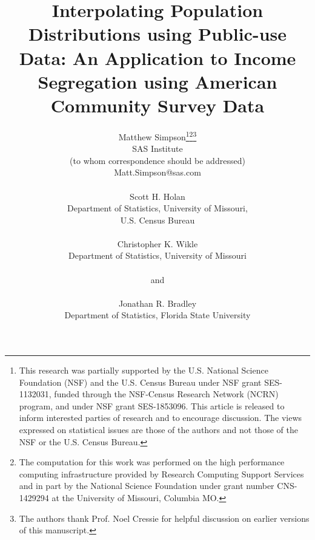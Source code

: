\documentclass[12pt]{article}
\renewcommand{\baselinestretch}{1.5}
\begin{document}
\def\spacingset#1{\renewcommand{\baselinestretch}%
{#1}\small\normalsize} \spacingset{1}


\vskip 2mm

{
  \title{\bf Interpolating Population Distributions using Public-use Data: An Application to Income Segregation using American Community Survey Data}
  \author{Matthew Simpson\thanks{This research was partially supported by the U.S. National Science Foundation (NSF) and the U.S. Census Bureau under NSF grant SES-1132031, funded through the NSF-Census Research Network (NCRN) program, and under NSF grant SES-1853096. This article is released to inform interested parties of research and to encourage discussion.  The views expressed on statistical issues are those of the authors and not those of the NSF or the U.S. Census Bureau.}\thanks{The computation for this work was performed on the high performance computing infrastructure provided by Research Computing Support Services and in part by the National Science Foundation under grant number CNS-1429294 at the University of Missouri, Columbia MO.}\thanks{The authors thank Prof. Noel Cressie for helpful discussion on earlier versions of this manuscript.}\hspace{.2cm}\\
    SAS Institute\\
    (to whom correspondence should be addressed)\\
    Matt.Simpson@sas.com\\\\
     Scott H. Holan\\
     Department of Statistics, University of Missouri,\\
     U.S. Census Bureau\\\\
     Christopher K. Wikle\\
       Department of Statistics, University of Missouri\\\\
       and\\\\
       Jonathan R. Bradley\\
       Department of Statistics, Florida State University}
     \maketitle
}
\end{document}
